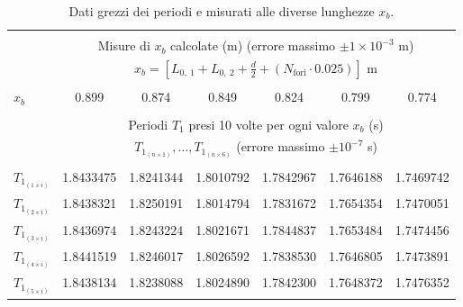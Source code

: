 \begin{table*}[t!]
    \centering
    \caption{Dati grezzi dei periodi  e  misurati alle diverse lunghezze $x_b$.}
    \footnotesize
    \label{table:raw_data}
    \begin{tabular}{l*{6}{c}}
        \hline\hline\\[-1.5ex]
                               & \multicolumn{6}{c}{Misure di $x_b$ calcolate (m) (errore massimo $\pm1\times10^{-3}$ m)}                 \\[+0.5ex] 
                               & \multicolumn{6}{c}{$x_b=\left[L_{0,~1} + L_{0,~2} + \frac{d}{2} + (N_{\text{fori}}\cdot0.025)\right]$ m} \\[+0.5ex] \hline \\[-1.5ex]
        $x_b$                  & 0.899     & 0.874              & 0.849              & 0.824     & 0.799     & 0.774                      \\[+0.5ex] \hline \\[-1.5ex]
                               & \multicolumn{6}{c}{Periodi $T_1$ presi 10 volte per ogni valore $x_b$ (s)}                               \\[+0.5ex]
                               & \multicolumn{6}{c}{$T_{1_{(n \times 1)}}, \ldots, T_{1_{(n \times 6)}}$ (errore massimo $\pm10^{-7}$ s)} \\[+0.5ex] \hline \\[-1.5ex]
        $T_{1_{(1 \times i)}}$ & 1.8433475 & 1.8241344          & 1.8010792          & 1.7842967 & 1.7646188 & 1.7469742                  \\[+0.5ex]
        $T_{1_{(2 \times i)}}$ & 1.8438321 & 1.8250191          & 1.8014794          & 1.7831672 & 1.7654354 & 1.7470051                  \\[+0.5ex]
        $T_{1_{(3 \times i)}}$ & 1.8436974 & 1.8243224          & 1.8021671          & 1.7844837 & 1.7653484 & 1.7474456                  \\[+0.5ex]
        $T_{1_{(4 \times i)}}$ & 1.8441519 & 1.8246017          & 1.8026592          & 1.7838530 & 1.7646805 & 1.7473891                  \\[+0.5ex]
        $T_{1_{(5 \times i)}}$ & 1.8438134 & 1.8238088          & 1.8024890          & 1.7842300 & 1.7648372 & 1.7476352                  \\[+0.5ex]

\end{tabular}
\end{table*}
